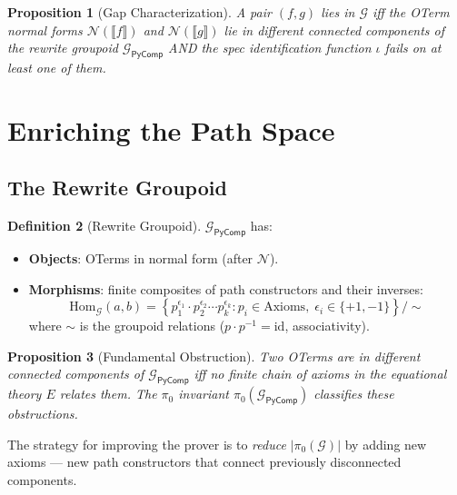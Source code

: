 \documentclass[11pt,a4paper]{report}
\theoremstyle{definition}
\newtheorem{definition}{Definition}[chapter]
\theoremstyle{plain}
\newtheorem{proposition}[definition]{Proposition}
\newcommand{\den}[1]{\llbracket #1 \rrbracket}
\begin{document}
\begin{proposition}[Gap Characterization]
\label{prop:gap-char}
A pair $(f, g)$ lies in $\mathcal{G}$ iff the OTerm normal forms
$\mathcal{N}(\den{f})$ and $\mathcal{N}(\den{g})$ lie in
different connected components of the rewrite groupoid
$\mathcal{G}_{\mathsf{PyComp}}$ AND the spec identification
function $\iota$ fails on at least one of them.
\end{proposition}


\section{Enriching the Path Space}
\label{sec:enriching-paths}

\subsection{The Rewrite Groupoid}

\begin{definition}[Rewrite Groupoid]
\label{def:rewrite-groupoid}
$\mathcal{G}_{\mathsf{PyComp}}$ has:
\begin{itemize}
  \item \textbf{Objects}: OTerms in normal form (after $\mathcal{N}$).
  \item \textbf{Morphisms}: finite composites of path constructors
    and their inverses:
    \[
      \mathrm{Hom}_{\mathcal{G}}(a, b) =
      \left\{ p_1^{\epsilon_1} \cdot p_2^{\epsilon_2} \cdots
      p_k^{\epsilon_k} :
      p_i \in \mathrm{Axioms},\; \epsilon_i \in \{+1, -1\}
      \right\} / {\sim}
    \]
    where $\sim$ is the groupoid relations ($p \cdot p^{-1} =
    \mathrm{id}$, associativity).
\end{itemize}
\end{definition}

\begin{proposition}[Fundamental Obstruction]
\label{prop:fundamental-obstruction}
Two OTerms are in different connected components of
$\mathcal{G}_{\mathsf{PyComp}}$ iff no finite chain of axioms
in the equational theory $E$ relates them.  The $\pi_0$ invariant
$\pi_0(\mathcal{G}_{\mathsf{PyComp}})$ classifies these
obstructions.
\end{proposition}

The strategy for improving the prover is to \emph{reduce}
$|\pi_0(\mathcal{G})|$ by adding new axioms --- new path
constructors that connect previously disconnected components.
\end{document}
